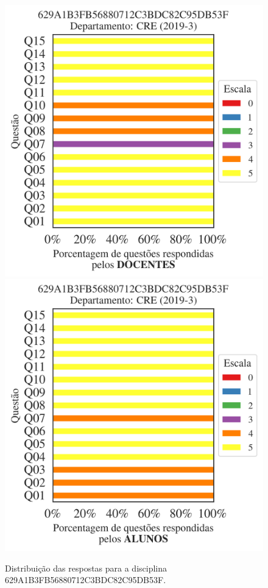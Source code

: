 \documentclass[a4paper,10pt]{article}
\begin{document}
\begin{figure}[h]
\centering
\includegraphics[width=0.485\linewidth]{analise_disciplina_departamento_CRE_629A1B3FB56880712C3BDC82C95DB53F_docentes.png}
\includegraphics[width=0.485\linewidth]{analise_disciplina_departamento_CRE_629A1B3FB56880712C3BDC82C95DB53F_alunos.png}
\caption{\label{fig:analise_geral_departamento}                Distribuição das respostas para a disciplina 629A1B3FB56880712C3BDC82C95DB53F. }
\end{figure}
\end{document}
